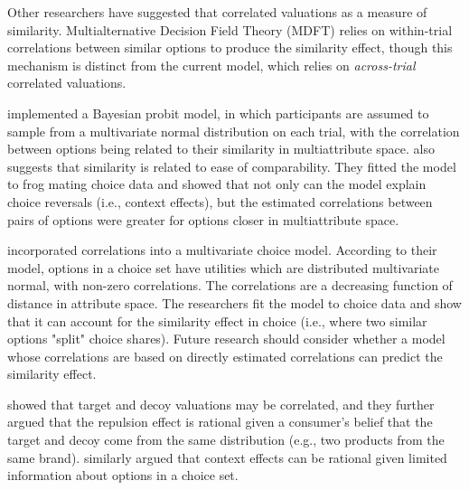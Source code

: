 Other researchers have suggested that correlated valuations as a measure of similarity. Multialternative Decision Field Theory (MDFT) \parencite{roeMultialternativeDecisionField2001a} relies on within-trial correlations between similar options to produce the similarity effect, though this mechanism is distinct from the current model, which relies on \textit{across-trial} correlated valuations. 

\textcite{natenzon2019random} implemented a Bayesian probit model, in which participants are assumed to sample from a multivariate normal distribution on each trial, with the correlation between options being related to their similarity in multiattribute space. \textcite{natenzon2019random} also suggests that similarity is related to ease of comparability. They fitted the model to frog mating choice data and showed that not only can the model explain choice reversals (i.e., context effects), but the estimated correlations between pairs of options were greater for options closer in multiattribute space. 

\textcite{kamakura1984predicting} incorporated correlations into a multivariate choice model. According to their model, options in a choice set have utilities which are distributed multivariate normal, with non-zero correlations. The correlations are a decreasing function of distance in attribute space. The researchers fit the model to choice data and show that it can account for the similarity effect in choice (i.e., where two similar options "split" choice shares). Future research should consider whether a model whose correlations are based on directly estimated correlations can predict the similarity effect. 

\textcite{bhui2021rational} showed that target and decoy valuations may be correlated, and they further argued that the repulsion effect is rational given a consumer's belief that the target and decoy come from the same distribution (e.g., two products from the same brand). \textcite{bhui2024context} similarly argued that context effects can be rational given limited information about options in a choice set. 

